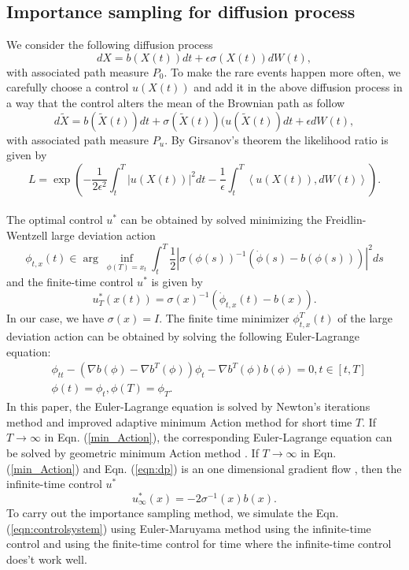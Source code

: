 \documentclass[journal,transmag]{IEEEtran}
\begin{document}
\subsection{Importance sampling for diffusion process}
We consider the following diffusion process
 \begin{equation} \label{eqn:dp}
d X = b(X(t))dt + \epsilon \sigma(X(t))dW(t),
\end{equation}
with associated path measure $P_0$. To make the rare events happen more often, we carefully choose a control $u(X(t))$ and  add it in the above diffusion process in a way that the control alters the mean of the Brownian path as follow
\begin{equation} \label{eqn:controlsystem}
 d \tilde{X} = b(\tilde{X}(t))dt +  \sigma(\tilde{X}(t))(u(\tilde{X}(t))dt +  \epsilon dW(t),
 \end{equation}
with associated path measure $P_u$. By Girsanov's theorem the likelihood ratio is given by   
\begin{equation}
L = \exp(-\frac{1}{2\epsilon^2}\int_t^T|u(X(t))|^2 dt - \frac{1}{\epsilon}\int_t^T \left<u(X(t)),dW(t)\right>).
\end{equation}
\\
The optimal control $u^*$ can be obtained by solved minimizing the Freidlin-Wentzell large deviation action \cite{RES_Eric}
\begin{equation} \label{min_Action}
\phi_{t,x}(t)  \in \arg\ \inf_{\phi(T) = x_t} \int_t^T \frac{1}{2}| \sigma(\phi(s))^{-1}(\dot{\phi}(s) - b(\phi(s)))|^2 ds
\end{equation}
and the finite-time control $u^*$ is given by 
\begin{equation} \label{control:1}
u^*_T(x(t)) = \sigma(x)^{-1}(\dot{\phi}_{t,x}(t) - b(x)).
\end{equation}
In our case, we have $\sigma(x) = I$. The finite time minimizer $\phi_{t,x}^T(t)$ of the large deviation action can be obtained by solving the following Euler-Lagrange equation: 
\begin{align} \label{Eqn:E_L} \nonumber
&\phi_{tt} - (\nabla b(\phi) -\nabla b^T(\phi)  )\phi_{t} - \nabla b^T(\phi) b(\phi) = 0 , t \in [t,T]\\ 
&\phi(t) = \phi_t,  \phi(T) = \phi_T.  
\end{align}
In this paper, the Euler-Lagrange equation is solved by Newton's iterations method and improved adaptive minimum Action method \cite{IAMAM} for short time $T$. 
If $T \rightarrow \infty$ in Eqn. (\ref{min_Action}), the corresponding Euler-Lagrange equation can be solved by geometric minimum Action method \cite{heymann_geometric_2008}.
If $T \rightarrow \infty$ in Eqn. (\ref{min_Action}) and Eqn. (\ref{eqn:dp}) is an one dimensional gradient flow \cite{freidlin_random_2012},
then the infinite-time control $u^*$ 
\begin{equation} \label{control:2} 
u^*_\infty(x) = -2\sigma^{-1}(x){b(x)}.
\end{equation}
To carry out the importance sampling method, we simulate the Eqn. (\ref{eqn:controlsystem}) using Euler-Maruyama method using the infinite-time control and using the finite-time control for time where the infinite-time control does't work well.  
\end{document}
